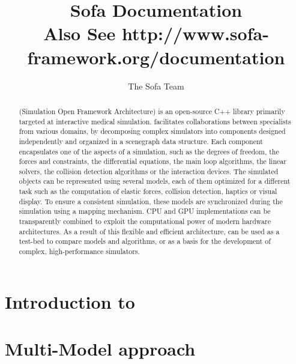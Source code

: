 \documentclass[a4paper,10pt]{report}
\title{Sofa Documentation\\
\vspace{10mm}\normalsize{Also See \bf{http://www.sofa-framework.org/documentation} } }
\author{The Sofa Team}
\begin{document}
\maketitle

\begin{abstract}	
\sofa{} (Simulation Open Framework Architecture) is an open-source C++ library primarily  targeted at interactive medical simulation.
\sofa{} facilitates collaborations between specialists from various domains, by decomposing complex simulators into components designed independently and organized in a scenegraph data structure.
Each component encapsulates one of the aspects of a simulation, such as the degrees of freedom, the forces and constraints, the differential equations, the main loop algorithms, the linear solvers, the collision detection algorithms or the interaction devices. The simulated objects can be represented using several models, each of them optimized for a different task such as the computation of elastic forces, collision detection, haptics or visual display. To ensure a consistent simulation, these models are synchronized during the simulation using a mapping mechanism.
CPU and GPU implementations can be transparently combined to exploit the computational power of modern hardware architectures.
As a result of this flexible and efficient architecture, \sofa{} can be used as a test-bed to compare models and algorithms, or as a basis for the development of complex, high-performance simulators.

\end{abstract}

\tableofcontents

\chapter{Introduction to \sofa}

\graphicspath{{../introduction/}}  %


\chapter{Multi-Model approach}
\graphicspath{{../multimodel/}}  %




\end{document}
